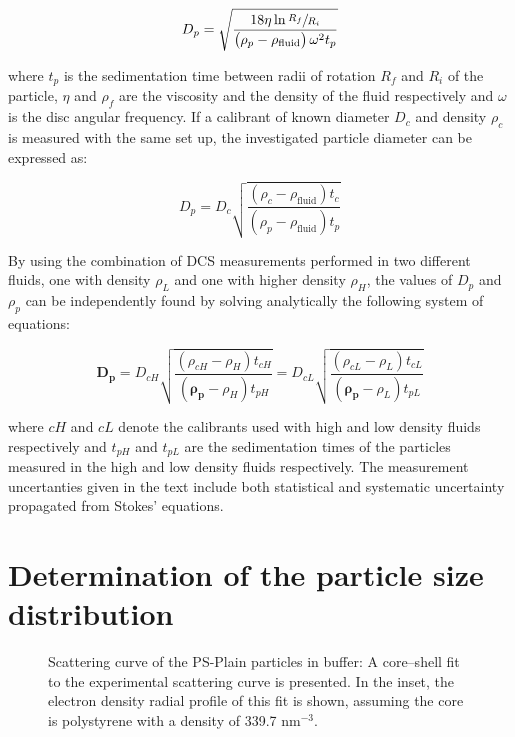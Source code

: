 \begin{equation}
D_p=\sqrt{\frac{18\eta\ln\sfrac{R_f}{R_i}}{\left( \rho_p - \rho_{\text{fluid}} \right)\omega^2 t_p}}
\label{eq:stokes}
\end{equation}

where $t_p$ is the sedimentation time between radii of rotation $R_f$ and $R_i$ of the particle, $\eta$ and $\rho_f$ are the viscosity and the density of the fluid respectively and $\omega$ is the disc angular frequency. If a calibrant of known diameter $D_c$ and density $\rho_c$ is measured with the same set up, the investigated particle diameter can be expressed as:

\begin{equation}
D_p=D_c\sqrt{\frac{\left( \rho_c - \rho_{\text{fluid}} \right) t_c}{\left( \rho_p - \rho_{\text{fluid}} \right) t_p}}
\label{eq:software}
\end{equation}

By using the combination of DCS measurements performed in two different fluids, one with density $\rho_L$ and one with higher density $\rho_H$, the values of $D_p$ and $\rho_p$ can be independently found by solving analytically the following system of equations:

\begin{equation}
\bm{D_p} = D_{cH}\sqrt{\frac{\left( \rho_{cH} - \rho_H \right) t_{cH}}{\left( \bm{\rho_p} - \rho_H \right) t_{pH}}} = D_{cL}\sqrt{\frac{\left( \rho_{cL} - \rho_L \right) t_{cL}}{\left( \bm{\rho_p} - \rho_L \right) t_{pL}}}
\label{eq:DCS_sys}
\end{equation}

where $cH$ and $cL$ denote the calibrants used with high and low density fluids respectively and $t_{pH}$ and $t_{pL}$ are the sedimentation times of the particles measured in the high and low density fluids respectively. The measurement uncertanties given in the text include both statistical and systematic uncertainty propagated from Stokes' equations.

\section{Determination of the particle size distribution}
\label{sec:size_validation}

\begin{figure}
	\begin{center}
		
	\end{center}
	\caption[Scattering curve of the PS-Plain particles in buffer.]{Scattering curve of the PS-Plain particles in buffer: A core–shell fit to the experimental scattering curve is presented. In the inset, the electron density radial profile of this fit is shown, assuming the core is polystyrene with a density of 339.7 nm$^{-3}$.}
	\label{fig:PSPlainSingleContrastSAXS}
\end{figure}

